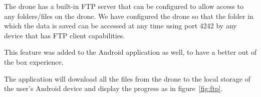 The drone has a built-in FTP server that can be configured to allow access to any folders/files on the drone. We have configured the drone so that the folder in which the data is saved can be accessed at any time using port 4242 by any device that has FTP client capabilities. 

This feature was added to the Android application as well, to have a better out of the box experience.

The application will download all the files from the drone to the local storage of the user's Android device and display the progress as in figure~\ref{fig:ftp}.

